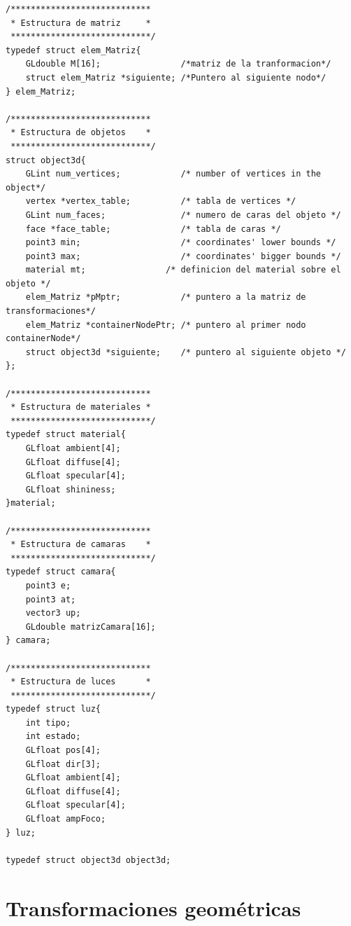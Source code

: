 \documentclass[12pt,a4paper]{article}
\begin{document}
\begin{lstlisting}
/****************************
 * Estructura de matriz     *
 ****************************/
typedef struct elem_Matriz{
    GLdouble M[16];                /*matriz de la tranformacion*/
    struct elem_Matriz *siguiente; /*Puntero al siguiente nodo*/
} elem_Matriz;

/****************************
 * Estructura de objetos    *
 ****************************/
struct object3d{
    GLint num_vertices;            /* number of vertices in the object*/
    vertex *vertex_table;          /* tabla de vertices */
    GLint num_faces;               /* numero de caras del objeto */
    face *face_table;              /* tabla de caras */
    point3 min;                    /* coordinates' lower bounds */
    point3 max;                    /* coordinates' bigger bounds */
    material mt;			    /* definicion del material sobre el objeto */
    elem_Matriz *pMptr;            /* puntero a la matriz de transformaciones*/
    elem_Matriz *containerNodePtr; /* puntero al primer nodo containerNode*/
    struct object3d *siguiente;    /* puntero al siguiente objeto */
};

/****************************
 * Estructura de materiales *
 ****************************/
typedef struct material{
	GLfloat ambient[4];
	GLfloat diffuse[4];
	GLfloat specular[4];
	GLfloat shininess;
}material;

/****************************
 * Estructura de camaras    *
 ****************************/
typedef struct camara{
    point3 e;
    point3 at;
    vector3 up;
    GLdouble matrizCamara[16];
} camara;

/****************************
 * Estructura de luces      *
 ****************************/
typedef struct luz{
    int tipo;
    int estado;
    GLfloat pos[4];
    GLfloat dir[3];
    GLfloat ambient[4];
    GLfloat diffuse[4];
    GLfloat specular[4];
    GLfloat ampFoco;
} luz;

typedef struct object3d object3d;

\end{lstlisting}










\newpage
\section{Transformaciones geométricas}
\end{document}
